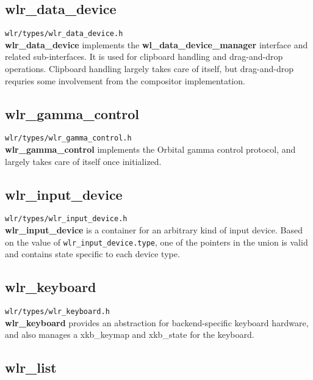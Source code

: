 \documentclass{article}
\newcommand{\code}[1]{\texttt{#1}}
\begin{document}
\subsection{wlr_data_device}\label{wlr data device}

\code{wlr/types/wlr_data_device.h}\\

\textbf{wlr_data_device} implements the \textbf{wl_data_device_manager}
interface and related sub-interfaces. It is used for clipboard handling and
drag-and-drop operations. Clipboard handling largely takes care of itself, but
drag-and-drop requries some involvement from the compositor implementation.

\subsection{wlr_gamma_control}\label{wlr gamma control}

\code{wlr/types/wlr_gamma_control.h}\\

\textbf{wlr_gamma_control} implements the Orbital gamma control protocol, and
largely takes care of itself once initialized.

\subsection{wlr_input_device}\label{wlr input device}

\code{wlr/types/wlr_input_device.h}\\

\textbf{wlr_input_device} is a container for an arbitrary kind of input device.
Based on the value of \code{wlr_input_device.type}, one of the pointers in the
union is valid and contains state specific to each device type.

\subsection{wlr_keyboard}\label{wlr keyboard}

\code{wlr/types/wlr_keyboard.h}\\

\textbf{wlr_keyboard} provides an abstraction for backend-specific keyboard
hardware, and also manages a xkb_keymap and xkb_state for the keyboard.

\subsection{wlr_list}\label{wlr list}
\end{document}
